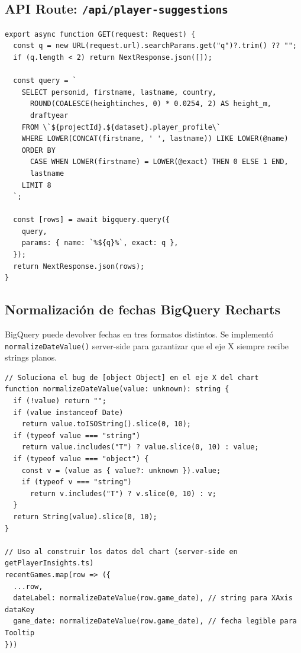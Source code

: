 \documentclass[12pt, letterpaper]{article}
\begin{document}
\subsection{API Route: \texttt{/api/player-suggestions}}

\begin{lstlisting}[style=codestyle, caption={API route de autocomplete --- \texttt{src/app/api/player-suggestions/route.ts}}]
export async function GET(request: Request) {
  const q = new URL(request.url).searchParams.get("q")?.trim() ?? "";
  if (q.length < 2) return NextResponse.json([]);

  const query = `
    SELECT personid, firstname, lastname, country,
      ROUND(COALESCE(heightinches, 0) * 0.0254, 2) AS height_m,
      draftyear
    FROM \`${projectId}.${dataset}.player_profile\`
    WHERE LOWER(CONCAT(firstname, ' ', lastname)) LIKE LOWER(@name)
    ORDER BY
      CASE WHEN LOWER(firstname) = LOWER(@exact) THEN 0 ELSE 1 END,
      lastname
    LIMIT 8
  `;

  const [rows] = await bigquery.query({
    query,
    params: { name: `%${q}%`, exact: q },
  });
  return NextResponse.json(rows);
}
\end{lstlisting}

\subsection{Normalización de fechas BigQuery \textrightarrow{} Recharts}

BigQuery puede devolver fechas en tres formatos distintos. Se implementó \linebreak\texttt{normalizeDateValue()} server-side para garantizar que el eje X siempre recibe strings planos.

\begin{lstlisting}[style=codestyle, caption={Función \texttt{normalizeDateValue} --- unifica los 3 formatos de fecha de BigQuery}]
// Soluciona el bug de [object Object] en el eje X del chart
function normalizeDateValue(value: unknown): string {
  if (!value) return "";
  if (value instanceof Date)
    return value.toISOString().slice(0, 10);
  if (typeof value === "string")
    return value.includes("T") ? value.slice(0, 10) : value;
  if (typeof value === "object") {
    const v = (value as { value?: unknown }).value;
    if (typeof v === "string")
      return v.includes("T") ? v.slice(0, 10) : v;
  }
  return String(value).slice(0, 10);
}

// Uso al construir los datos del chart (server-side en getPlayerInsights.ts)
recentGames.map(row => ({
  ...row,
  dateLabel: normalizeDateValue(row.game_date), // string para XAxis dataKey
  game_date: normalizeDateValue(row.game_date), // fecha legible para Tooltip
}))
\end{lstlisting}
\end{document}
